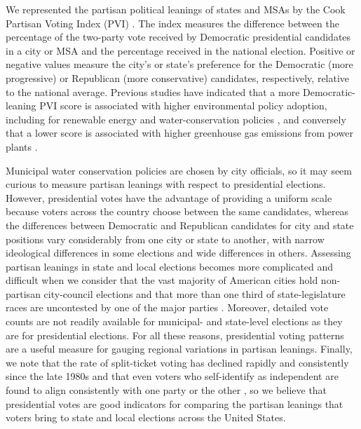 \documentclass[draft,linenumbers]{agujournal}
\begin{document}
We represented the partisan political leanings of states and MSAs by the
Cook Partisan Voting Index (PVI) \citep{cook:pvi:2013}. The index measures
the difference between the percentage of the two-party vote received by
Democratic presidential candidates in a city or MSA and the percentage received
in the national election. Positive or negative values measure the
city's or state's preference for the Democratic (more progressive)
or Republican (more conservative) candidates,
respectively, relative to the national average.
Previous studies have indicated that a more Democratic-leaning PVI score is associated with higher environmental
policy adoption, including for renewable energy \citep{chupp:environ.voting:2011}
and water-conservation policies \citep{hess:drought:2016}, and conversely that a lower score is associated with
higher greenhouse gas emissions from power plants \citep{grant:environ.accountability:2017}.

Municipal water conservation policies are chosen by city officials, so it
may seem curious to measure partisan leanings with respect to presidential
elections. However, presidential votes have the advantage of providing a uniform
scale because voters across the country choose between the same candidates,
whereas the differences between Democratic and Republican candidates for
city and state positions vary considerably from one city or state to another,
with narrow ideological differences in some elections and wide differences in
others. Assessing partisan leanings in state and local
elections becomes more complicated and difficult when we consider that
the vast majority of American cities hold non-partisan city-council elections
\citep{svara:city.councils:2003} and that more than one third of state-legislature
races are uncontested by one of the major parties
\citep{klarner:state.elections:2015,ap:uncontested:2006}.
Moreover, detailed vote
counts are not readily available for municipal- and state-level elections as
they are for presidential elections. For all these reasons, presidential
voting patterns are a useful measure for gauging regional variations in partisan
leanings.
Finally, we note that the rate of split-ticket voting has declined rapidly
and consistently since the late 1980s \citep{fiorina:renationalization:2016}
and that even voters who self-identify as independent are found to align
consistently with one party or the other \citep{hawkins:motivated:2012},
so we believe that
presidential votes are good indicators for comparing the partisan leanings
that voters bring to state and local elections across the United States.
\end{document}
